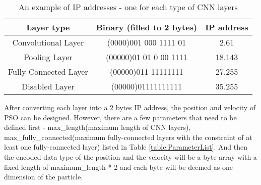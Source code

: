 \documentclass[conference]{IEEEtran}
\begin{document}
\begin{table}[!t]
	\renewcommand{\arraystretch}{1.3}
	\caption{An example of IP addresses - one for each type of CNN layers}
	\label{table:IPExample}
	\centering
	\begin{tabular}{|c|c|c|}
		\hline
		Layer type & Binary (filled to 2 bytes) & IP address\\
		\hline
		Convolutional Layer & (0000)001 000 1111 01 & 2.61\\
		\hline
		Pooling Layer & (00000)01 01 0 00 1111 & 18.143\\
		\hline
		Fully-Connected Layer & (00000)011 11111111 & 27.255\\
		\hline
		Disabled Layer & (00000)01111111111 & 35.255\\
		\hline
	\end{tabular}
\end{table}

After converting each layer into a 2 bytes IP address, the position and velocity of PSO can be designed. However, there are a few parameters that need to be defined first - max\_length(maximum length of CNN layers), max\_fully\_connected(maximum fully-connected layers with the constraint of at least one fully-connected layer) listed in Table \ref{table:ParameterList}. And then the encoded data type of the position and the velocity will be a byte array with a fixed length of maximum\_length * 2 and each byte will be deemed as one dimension of the particle.
\end{document}

